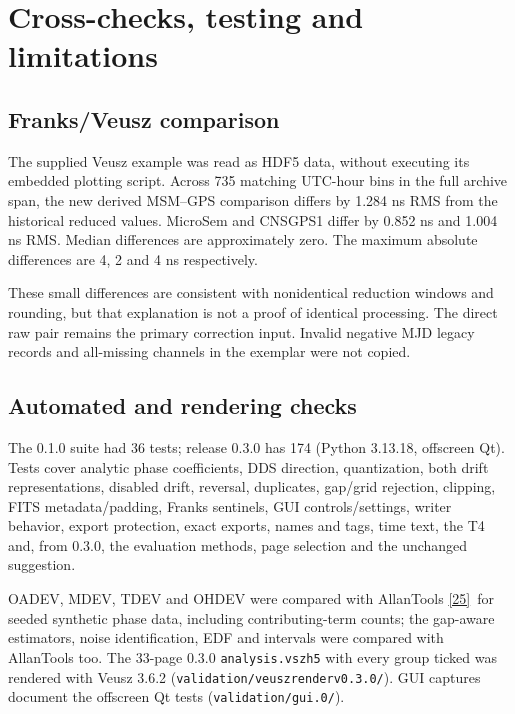 \documentclass[11pt,a4paper]{article}
\newcommand{\allantools}{\href{https://github.com/aewallin/allantools}{[25]}}
\renewcommand{\_}{\usscore\allowbreak}
\begin{document}
\section{Cross-checks, testing and limitations}
\subsection{Franks/Veusz comparison}
The supplied Veusz example was read as HDF5 data, without executing its
embedded plotting script. Across 735 matching UTC-hour bins in the full
archive span, the new derived MSM--GPS comparison differs by 1.284 ns RMS
from the historical reduced values. MicroSem and CNS\_GPS1 differ by
0.852 ns and 1.004 ns RMS. Median differences are approximately zero.
The maximum absolute differences are 4, 2 and 4 ns respectively.

These small differences are consistent with nonidentical reduction windows
and rounding, but that explanation is not a proof of identical processing.
The direct raw pair remains the primary correction input. Invalid negative
MJD legacy records and all-missing channels in the exemplar were not copied.

\subsection{Automated and rendering checks}
The 0.1.0 suite had 36 tests; release 0.3.0 has 174 (Python 3.13.18, offscreen Qt). Tests cover analytic
phase coefficients, DDS direction, quantization, both drift representations,
disabled drift, reversal, duplicates, gap/grid rejection, clipping, FITS
metadata/padding, Franks sentinels, GUI controls/settings, writer behavior,
export protection, exact exports, names and tags, time text, the T4 and, from 0.3.0, the evaluation methods,
page selection and the unchanged suggestion.

OADEV, MDEV, TDEV and OHDEV were compared with AllanTools \allantools\ for seeded synthetic
phase data, including contributing-term counts; the gap-aware estimators, noise identification, EDF and
intervals were compared with AllanTools too. The 33-page 0.3.0 \texttt{analysis.vszh5} with every group ticked
was rendered with Veusz 3.6.2 (\texttt{validation/veusz\_render\_v0.3.0/}). GUI captures document the offscreen
Qt tests (\texttt{validation/gui\_0.3.0/}).
\end{document}
